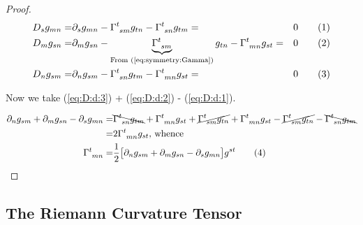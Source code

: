 \documentclass[]{article}
\newcommand\numberthis{\addtocounter{equation}{1}\tag{\theequation}}
\begin{document}
\begin{proof}
	\begin{align*}
		D_s g_{mn} =& \partial_s g_{mn} - \Gamma\indices{^t_{sm}} g_{tn} - \Gamma\indices{^t_{sn}} g_{tm} 	=& 0 \numberthis \label{eq:D:d:1}\\
		D_m g_{sn} =& \partial_m g_{sn} - \underbrace{\Gamma\indices{^t_{sm}}}_\text{From (\ref{eq:symmetry:Gamma})} g_{tn} - \Gamma\indices{^t_{mn}} g_{st} 	=& 0 \numberthis \label{eq:D:d:2}\\
		D_n g_{sm} =& \partial_n g_{sm} - \Gamma\indices{^t_{sn}} g_{tm} - \Gamma\indices{^t_{mn}} g_{st} 	=& 0 \numberthis \label{eq:D:d:3}
	\end{align*}
	
	Now we take (\ref{eq:D:d:3}) + (\ref{eq:D:d:2}) - (\ref{eq:D:d:1}).
	
	\begin{align*}
		\partial_n g_{sm} + \partial_m g_{sn}- \partial_s g_{mn} =& \bcancel{\Gamma\indices{^t_{sn}} g_{tm}} + \Gamma\indices{^t_{mn}} g_{st} + \cancel{\Gamma\indices{^t_{sm}}g_{tn}} + \Gamma\indices{^t_{mn}} g_{st} - \cancel{\Gamma\indices{^t_{sm}} g_{tn}} - \bcancel{\Gamma\indices{^t_{sn}} g_{tm}} \\
		=&2 \Gamma\indices{^t_{mn}} g_{st} \text{, whence}\\
		\Gamma\indices{^t_{mn}} =& \frac{1}{2}\big[\partial_n g_{sm} + \partial_m g_{sn}- \partial_s g_{mn}\big]  g^{st} \numberthis \label{eq:christoffel:g}  
	\end{align*}
\end{proof}

\subsection{The Riemann Curvature Tensor}
\end{document}
